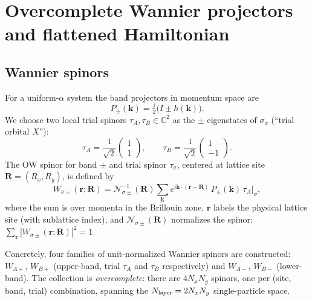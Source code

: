 \documentclass[aps,prb,twocolumn,showpacs,floatfix]{revtex4-2}
\newcommand{\WFAp}{W_{A+}}
\newcommand{\WFBp}{W_{B+}}
\newcommand{\WFAm}{W_{A-}}
\newcommand{\WFBm}{W_{B-}}
\newcommand{\tauA}{\tau_A}
\newcommand{\tauB}{\tau_B}
\begin{document}
\section{Overcomplete Wannier projectors and flattened Hamiltonian}
\label{sec:ow}

\subsection{Wannier spinors}

For a uniform-$\alpha$ system the band projectors in momentum space are
\begin{equation}
P_{\pm}(\bm{k}) = \tfrac{1}{2}\bigl(I \pm h(\bm{k})\bigr).
\label{eq:band_proj}
\end{equation}
We choose two local trial spinors $\tauA, \tauB \in \mathbb{C}^2$ as the
$\pm$ eigenstates of $\sigma_x$ (``trial orbital $X$''):
\begin{equation}
\tauA = \frac{1}{\sqrt{2}}\begin{pmatrix}1\\1\end{pmatrix}, \qquad
\tauB = \frac{1}{\sqrt{2}}\begin{pmatrix}1\\-1\end{pmatrix}.
\label{eq:trial}
\end{equation}
The OW spinor for band $\pm$ and trial spinor $\tau_\sigma$, centered at
lattice site $\bm{R} = (R_x, R_y)$, is defined by
\begin{equation}
W_{\sigma\pm}(\bm{r};\bm{R}) =
\mathcal{N}^{-1}_{\sigma\pm}(\bm{R}) \sum_{\bm{k}}
e^{i\bm{k}\cdot(\bm{r}-\bm{R})}\,P_\pm(\bm{k})\,\tauA \big|_{\sigma},
\label{eq:wannier_def}
\end{equation}
where the sum is over momenta in the Brillouin zone,
$\bm{r}$ labels the physical lattice site (with sublattice index),
and $\mathcal{N}_{\sigma\pm}(\bm{R})$ normalizes the spinor:
$\sum_{\bm{r}} |W_{\sigma\pm}(\bm{r};\bm{R})|^2 = 1$.

Concretely, four families of unit-normalized Wannier spinors are constructed:
$\WFAp$, $\WFBp$ (upper-band, trial $\tauA$ and $\tauB$ respectively)
and $\WFAm$, $\WFBm$ (lower-band).
The collection is \emph{overcomplete}: there are $4 N_x N_y$ spinors, one per
(site, band, trial) combination, spanning the $N_{\rm layer} = 2 N_x N_y$
single-particle space.
\end{document}
